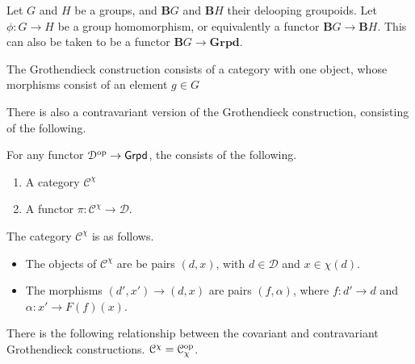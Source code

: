 \documentclass[main.tex]{subfiles}
\begin{document}
\begin{example}
  Let $G$ and $H$ be a groups, and $\mathbf{B}G$ and $\mathbf{B}H$ their delooping groupoids. Let $\phi\colon G \to H$ be a group homomorphism, or equivalently a functor $\mathbf{B}G \to \mathbf{B}H$. This can also be taken to be a functor $\mathbf{B}G \to \mathbf{Grpd}$.

  The Grothendieck construction consists of a category with one object, whose morphisms consist of an element $g \in G$
\end{example}

There is also a contravariant version of the Grothendieck construction, consisting of the following.
\begin{definition}
  \label{def:contravariant_grothendieck_construction}
  For any functor $\mathcal{D}^{\mathrm{op}} \to \mathsf{Grpd}$, the  consists of the following.
  \begin{enumerate}[label=\arabic*.]
    \item A category $\mathcal{C}^{\chi}$

    \item A functor $\pi\colon \mathcal{C}^{\chi} \to \mathcal{D}$.
  \end{enumerate}
  The category $\mathcal{C}^{\chi}$ is as follows.
  \begin{itemize}
    \item The objects of $\mathcal{C}^{\chi}$ are be pairs $(d, x)$, with $d \in \mathcal{D}$ and $x \in \chi(d)$.

    \item The morphisms $(d', x') \to (d, x)$ are pairs $(f, \alpha)$, where $f\colon d' \to d$ and $\alpha\colon x' \to F(f)(x)$.
  \end{itemize}
\end{definition}

There is the following relationship between the covariant and contravariant Grothendieck constructions. $\mathcal{C}^{\chi} = \mathcal{C}_{\chi}^{\mathrm{op}}$.
\end{document}
